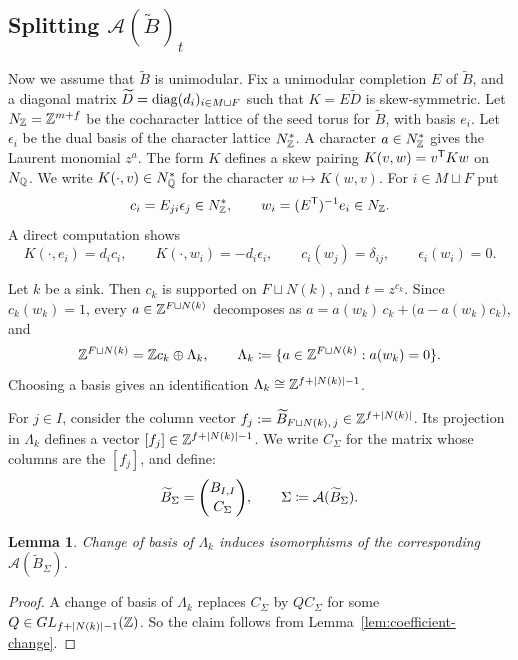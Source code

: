 \documentclass[12pt, letter]{amsart}
\newtheorem{lemma}[dummy]{Lemma}
\theoremstyle{definition}
\begin{document}
\subsection{Splitting $\mathcal{A}(\widetilde{B})_t$}\label{sec:At-splitting}
Now we assume that \(\widetilde B\) is unimodular.
Fix a unimodular completion $E$ of $\widetilde B$, and a diagonal matrix $\widetilde D=\operatorname{diag}(d_i)_{i\in M\sqcup F}$ such that $K=E\widetilde D$ is skew-symmetric.
Let $N_{\mathbb{Z}}=\mathbb{Z}^{m+f}$ be the cocharacter lattice of the seed torus for $\widetilde B$, with basis $e_i$.
Let $\epsilon_i$ be the dual basis of the character lattice $N_{\mathbb{Z}}^*$.
A character $a\in N_{\mathbb{Z}}^*$ gives the Laurent monomial $z^a$.
The form $K$ defines a skew pairing $K(v,w)=v^{\mathsf T}Kw$ on $N_{\mathbb{Q}}$.
We write $K(\cdot,v)\in N_{\mathbb{Q}}^*$ for the character $w\mapsto K(w,v)$.
For $i\in M\sqcup F$ put
\begin{equation}\label{eq:dual-circles}
 c_i= E_{ji} \epsilon_j \in N_{\mathbb{Z}}^*,\qquad w_i=(E^{\mathsf T})^{-1}e_i\in N_{\mathbb{Z}}.
\end{equation}
A direct computation shows
\begin{equation}\label{eq:dual-circle-identities}
 K(\cdot,e_i)=d_ic_i,\qquad K(\cdot,w_i)=-d_i\epsilon_i,\qquad c_i(w_j)=\delta_{ij},\qquad \epsilon_i(w_i)=0 .
\end{equation}

Let \(k\) be a sink.
Then $c_k$ is supported on $F\sqcup N(k)$, and $t=z^{c_k}$. 
Since $c_k(w_k)=1$, every $a\in\mathbb{Z}^{F\sqcup N(k)}$ decomposes as $a=a(w_k)\,c_k+\bigl(a-a(w_k)c_k\bigr)$, and
\begin{equation}\label{eq:frozen-splitting}
 \mathbb{Z}^{F\sqcup N(k)}=\mathbb{Z} c_k\oplus\Lambda_k,\qquad
 \Lambda_k \coloneqq \{a\in\mathbb{Z}^{F\sqcup N(k)}:a(w_k)=0\}.
\end{equation}
Choosing a basis gives an identification 
$ \Lambda_k \cong \mathbb{Z}^{ f + |N(k)| - 1}$. 

For $j\in I$, consider the column vector $f_j:=\widetilde B_{F\sqcup N(k),\,j} \in \mathbb{Z}^{ f + |N(k)|}$. Its projection in \(\Lambda_k\) defines a vector \( [f_j] \in \mathbb{Z}^{f+|N(k)|-1}\). 
We write $C_\Sigma$ for the matrix whose columns are the $[f_j]$, and define: 
\[
 \widetilde B_\Sigma=\binom{B_{I,I}}{C_\Sigma}, \qquad \Sigma\coloneqq \mathcal{A}(\widetilde B_\Sigma). 
\]
\begin{lemma}
    Change of basis of $\Lambda_k$ induces isomorphisms of the corresponding $\mathscr{A}(\widetilde{B}_\Sigma)$.
\end{lemma}
\begin{proof}
A change of basis of $\Lambda_k$ replaces $C_\Sigma$ by $QC_\Sigma$ for some $Q\in GL_{f+|N(k)|-1}(\mathbb{Z})$.
So the claim follows from Lemma~\ref{lem:coefficient-change}. 
\end{proof}
\end{document}
